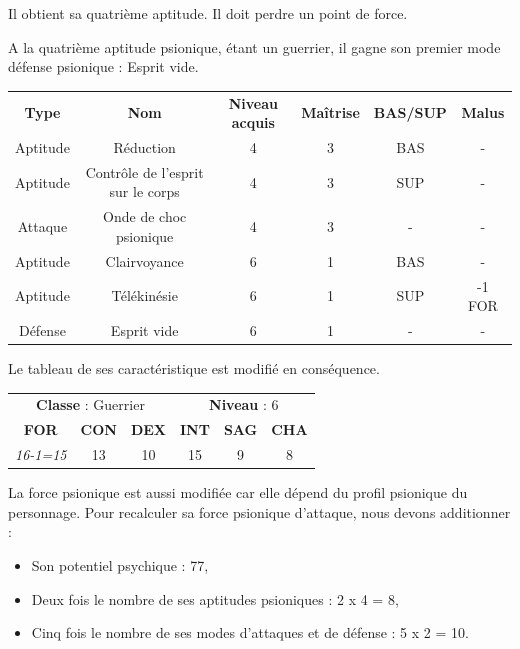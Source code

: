 \documentclass[11pt]{article}
\begin{document}
{\bigskip

Il obtient sa quatrième aptitude. Il doit perdre un point de force.

\bigskip

A la quatrième aptitude psionique, étant un guerrier, il gagne son premier mode défense psionique : Esprit vide.

\bigskip

\begin{tabular}{cccccc}
\textbf{Type }& \textbf{Nom} & \textbf{Niveau acquis} & \textbf{Maîtrise}  & \textbf{BAS/SUP} & \textbf{Malus} \\
Aptitude &  Réduction                        & 4 & 3 & BAS & - \\
Aptitude & Contrôle de l'esprit sur le corps & 4 & 3 & SUP & - \\
Attaque  & Onde de choc psionique            & 4 & 3 & -   & - \\
Aptitude & Clairvoyance                      & 6 & 1 & BAS & - \\
Aptitude & Télékinésie                       & 6 & 1 & SUP & -1 FOR\\
Défense & Esprit vide                        & 6 & 1 & -   & - \\
\end{tabular}

\bigskip

Le tableau de ses caractéristique est modifié en conséquence.

\bigskip

\begin{tabular}{cccccc}
\multicolumn{3}{c}{\textbf{Classe} : Guerrier} & \multicolumn{3}{c}{\textbf{Niveau} : 6} \\
\textbf{FOR} & \textbf{CON} & \textbf{DEX} & \textbf{INT} & \textbf{SAG} & \textbf{CHA} \\
\textit{16-1=15} & 13 & 10 & 15 & 9 & 8 \\
\end{tabular}

\bigskip

La force psionique est aussi modifiée car elle dépend du profil psionique du personnage. Pour recalculer sa force psionique d'attaque, nous devons additionner :

\bigskip

\begin{itemize}
\item Son potentiel psychique : 77,
\item Deux fois le nombre de ses aptitudes psioniques : 2 x 4 = 8,
\item Cinq fois le nombre de ses modes d'attaques et de défense : 5 x 2 = 10.
\end{itemize}

}
\end{document}
